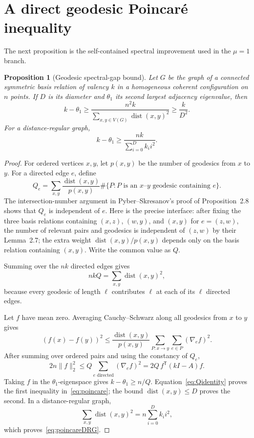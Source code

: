 \documentclass[11pt]{amsart}
\newtheorem{proposition}[theorem]{Proposition}
\theoremstyle{definition}
\newcommand{\dist}{\operatorname{dist}}
\begin{document}
\section{A direct geodesic Poincar\'e inequality}
The next proposition is the self-contained spectral improvement used in the $\mu=1$ branch.

\begin{proposition}[Geodesic spectral-gap bound]\label{prop:poincare}
Let $G$ be the graph of a connected symmetric basis relation of valency $k$ in a homogeneous coherent configuration on $n$ points.  If $D$ is its diameter and $\theta_1$ its second largest adjacency eigenvalue, then
\begin{equation}\label{eq:poincare}
 k-\theta_1\ge
 \frac{n^2k}{\displaystyle\sum_{x,y\in V(G)}\dist(x,y)^2}
 \ge\frac{k}{D^2}.
\end{equation}
For a distance-regular graph,
\begin{equation}\label{eq:poincareDRG}
 k-\theta_1\ge
 \frac{nk}{\displaystyle\sum_{i=0}^{D}k_i i^2}.
\end{equation}
\end{proposition}

\begin{proof}
For ordered vertices $x,y$, let $p(x,y)$ be the number of geodesics from $x$ to $y$.  For a directed edge $e$, define
\[
 Q_e=\sum_{x,y}
 \frac{\dist(x,y)}{p(x,y)}
 \#\{P:P\text{ is an }x\text{--}y\text{ geodesic containing }e\}.
\]
The intersection-number argument in Pyber--Skresanov's proof of Proposition~2.8 shows that $Q_e$ is independent of $e$.  Here is the precise interface: after fixing the three basis relations containing $(x,z)$, $(w,y)$, and $(x,y)$ for $e=(z,w)$, the number of relevant pairs and geodesics is independent of $(z,w)$ by their Lemma~2.7; the extra weight $\dist(x,y)/p(x,y)$ depends only on the basis relation containing $(x,y)$.  Write the common value as $Q$.

Summing over the $nk$ directed edges gives
\begin{equation}\label{eq:Qidentity}
 nkQ=\sum_{x,y}\dist(x,y)^2,
\end{equation}
because every geodesic of length $\ell$ contributes $\ell$ at each of its $\ell$ directed edges.

Let $f$ have mean zero.  Averaging Cauchy--Schwarz along all geodesics from $x$ to $y$ gives
\[
 (f(x)-f(y))^2
 \le \frac{\dist(x,y)}{p(x,y)}
 \sum_{P:x\to y}\sum_{e\in P}(\nabla_e f)^2.
\]
After summing over ordered pairs and using the constancy of $Q_e$,
\[
 2n\lVert f\rVert_2^2
 \le Q\sum_{e\text{ directed}}(\nabla_e f)^2
 =2Q\,f^{\mathsf T}(kI-A)f.
\]
Taking $f$ in the $\theta_1$-eigenspace gives $k-\theta_1\ge n/Q$.  Equation~\eqref{eq:Qidentity} proves the first inequality in~\eqref{eq:poincare}; the bound $\dist(x,y)\le D$ proves the second.  In a distance-regular graph,
\[
 \sum_{x,y}\dist(x,y)^2=n\sum_{i=0}^{D}k_i i^2,
\]
which proves~\eqref{eq:poincareDRG}.
\end{proof}
\end{document}
